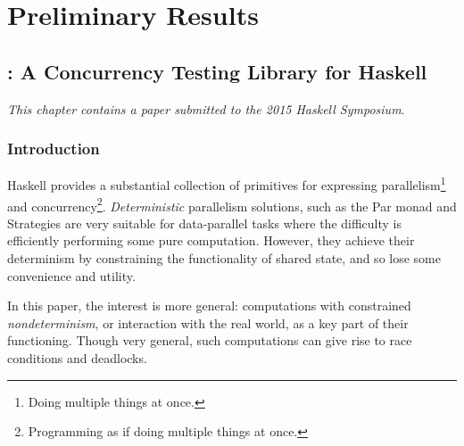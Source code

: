 \part{Preliminary Results}


\chapter{\dejafu{}: A Concurrency Testing Library for Haskell}
\label{chp:dejafu}

\textit{This chapter contains a paper submitted to the 2015 Haskell
  Symposium}\cite{dejafu}.

\section{Introduction}
\label{sec:dejafu-intro}

Haskell provides a substantial collection of primitives for expressing
parallelism\footnote{Doing multiple things at once.} and
concurrency\footnote{Programming as if doing multiple things at
  once.}. \textit{Deterministic} parallelism solutions, such as the
Par monad\cite{parmonad} and Strategies\cite{strategies} are very
suitable for data-parallel tasks where the difficulty is efficiently
performing some pure computation. However, they achieve their
determinism by constraining the functionality of shared state, and so
lose some convenience and utility.

In this paper, the interest is more general: computations with
constrained \textit{nondeterminism}, or interaction with the real
world, as a key part of their functioning. Though very general, such
computations can give rise to race conditions and deadlocks.

